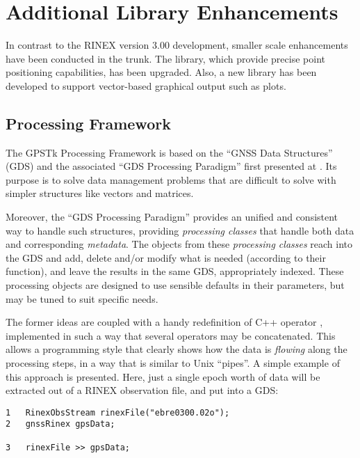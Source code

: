 \section*{Additional Library Enhancements}

In contrast to the RINEX version 3.00 development, smaller scale
enhancements have been conducted in the trunk. The
 library, which provide precise point positioning
capabilities, has been upgraded. Also, a new library has been
developed to support vector-based graphical output such as plots.

\subsection*{Processing Framework}

The GPSTk Processing Framework is based on the ``GNSS Data Structures'' (GDS)
and the associated ``GDS Processing Paradigm'' first presented at
\cite{ion:gnss07}. Its purpose is to solve data management problems that are
difficult to solve with simpler structures like vectors and matrices.

Moreover, the ``GDS Processing Paradigm'' provides an unified and consistent way
to handle such structures, providing {\it processing classes} that handle both
data and corresponding {\it metadata}. The objects from these {\it processing
classes} reach into the GDS and add, delete and/or modify what is needed
(according to their function), and leave the results in the same GDS,
appropriately indexed. These processing objects are designed to use sensible
defaults in their parameters, but may be tuned to suit specific needs.

The former ideas are coupled with a handy redefinition of C++ operator
\gpstkcommand{>>}, implemented in such a way that several operators may be
concatenated. This allows a programming style that clearly shows how the data is
{\it flowing} along the processing steps, in a way that is similar to Unix
``pipes''. A simple example of this approach is presented. Here, just a single
epoch worth of data will be extracted out of a RINEX observation file, and put
into a GDS:

\begin{scriptsize}
\begin{lstlisting}
1   RinexObsStream rinexFile("ebre0300.02o");
2   gnssRinex gpsData;

3   rinexFile >> gpsData;
\end{lstlisting}
\end{scriptsize}


